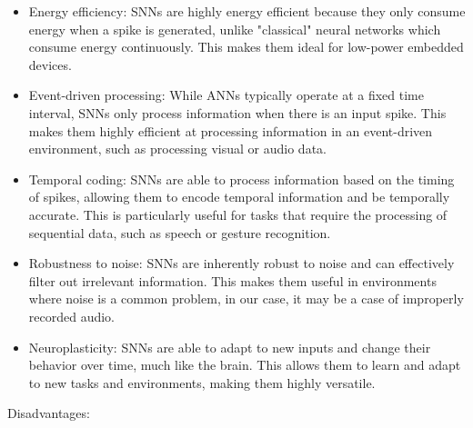 \documentclass[11pt]{article}
\begin{document}
\begin{itemize}
  \item Energy efficiency: SNNs are highly energy efficient because they only consume energy when a spike is generated, unlike "classical" neural networks which consume energy continuously. This makes them ideal for low-power embedded devices.

  \item Event-driven processing: While ANNs typically operate at a fixed time interval, SNNs only process information when there is an input spike. This makes them highly efficient at processing information in an event-driven environment, such as processing visual or audio data.

  \item Temporal coding: SNNs are able to process information based on the timing of spikes, allowing them to encode temporal information and be temporally accurate. This is particularly useful for tasks that require the processing of sequential data, such as speech or gesture recognition.

  \item Robustness to noise: SNNs are inherently robust to noise and can effectively filter out irrelevant information. This makes them useful in environments where noise is a common problem, in our case, it may be a case of improperly recorded audio.

  \item Neuroplasticity: SNNs are able to adapt to new inputs and change their behavior over time, much like the brain. This allows them to learn and adapt to new tasks and environments, making them highly versatile.

\end{itemize}


Disadvantages:
\end{document}
